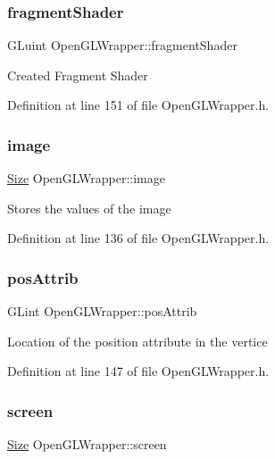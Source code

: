 \subsubsection{\texorpdfstring{fragmentShader}{fragmentShader}}
{\footnotesize\ttfamily G\+Luint Open\+G\+L\+Wrapper\+::fragment\+Shader\hspace{0.3cm}{\ttfamily [private]}}

Created Fragment Shader 

Definition at line 151 of file Open\+G\+L\+Wrapper.\+h.

\mbox{\label{classOpenGLWrapper_adef2a1ed2b3a9a9602b2cf2b82acc9dd}} 
\subsubsection{\texorpdfstring{image}{image}}
{\footnotesize\ttfamily \mbox{\hyperlink{classSize}{Size}} Open\+G\+L\+Wrapper\+::image\hspace{0.3cm}{\ttfamily [private]}}

Stores the values of the image 

Definition at line 136 of file Open\+G\+L\+Wrapper.\+h.

\mbox{\label{classOpenGLWrapper_addd025216ff4986440d529dec28d9996}} 
\subsubsection{\texorpdfstring{posAttrib}{posAttrib}}
{\footnotesize\ttfamily G\+Lint Open\+G\+L\+Wrapper\+::pos\+Attrib\hspace{0.3cm}{\ttfamily [private]}}

Location of the position attribute in the vertice 

Definition at line 147 of file Open\+G\+L\+Wrapper.\+h.

\mbox{\label{classOpenGLWrapper_ab9d6bc93fd838a85c8bdb98224a9a54c}} 
\subsubsection{\texorpdfstring{screen}{screen}}
{\footnotesize\ttfamily \mbox{\hyperlink{classSize}{Size}} Open\+G\+L\+Wrapper\+::screen\hspace{0.3cm}{\ttfamily [private]}}

